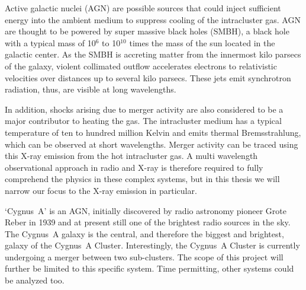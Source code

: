 \documentclass[MScProj_TLRH_ClusterEnergy.tex]{subfiles}
\begin{document}
Active galactic nuclei (AGN) are possible sources that could inject sufficient energy into the ambient medium to suppress cooling of the intracluster gas. AGN are thought to be powered by super massive black holes (SMBH), a black hole with a typical mass of 10$^6$ to 10$^{10}$ times the mass of the sun located in the galactic center. As the SMBH is accreting matter from the innermost kilo parsecs of the galaxy, violent collimated outflow accelerates electrons to relativistic velocities over distances up to several kilo parsecs. These jets emit synchrotron radiation, thus, are visible at long wavelengths.

In addition, shocks arising due to merger activity are also considered to be a major contributor to heating the gas. The intracluster medium has a typical temperature of ten to hundred million Kelvin and emits thermal Bremsstrahlung, which can be observed at short wavelengths. Merger activity can be traced using this X-ray emission from the hot intracluster gas. A multi wavelength observational approach in radio and X-ray is therefore required to fully comprehend the physics in these complex systems, but in this thesis we will narrow our focus to the X-ray emission in particular.

`Cygnus~A' is an AGN, initially discovered by radio astronomy pioneer Grote Reber in 1939 and at present still one of the brightest radio sources in the sky. The Cygnus~A galaxy is the central, and therefore the biggest and brightest, galaxy of the Cygnus~A Cluster.  Interestingly, the Cygnus~A Cluster is currently undergoing a merger between two sub-clusters. The scope of this project will further be limited to this specific system. Time permitting, other systems could be analyzed too.
\end{document}
